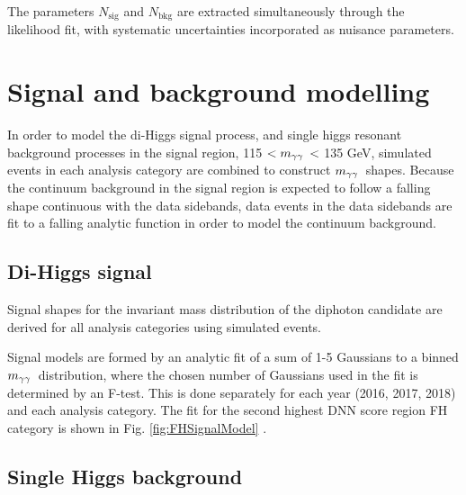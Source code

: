 The parameters \(N_{\text{sig}}\) and \(N_{\text{bkg}}\) are extracted simultaneously through the likelihood fit, with systematic uncertainties incorporated as nuisance parameters.


\section{Signal and background modelling} \label{sec:AnalyticFitting}

In order to model the di-Higgs signal process, and single higgs resonant background processes in the signal region, 115 $< m_{\gamma\gamma}\hspace{0.2em} < $ 135 GeV, simulated events
in each analysis category are combined to construct $m_{\gamma\gamma}\hspace{0.2em}$ shapes. Because the continuum background in the signal region is expected to follow a falling
shape continuous with the data sidebands, data events in the data sidebands are fit to a falling analytic function in order to model the continuum background.

\subsection{Di-Higgs signal}
\label{sec:SignalFitting}

Signal shapes for the invariant mass distribution of the diphoton candidate are derived for all analysis categories using simulated events.

Signal models are formed by an analytic fit of a sum of 1-5 Gaussians to a binned $m_{\gamma\gamma}\hspace{0.2em}$ distribution, where the chosen number of Gaussians used in the fit is
determined by an F-test. This is done separately for each year (2016, 2017, 2018) and each analysis category.
The fit for the second highest DNN score region FH category is shown
in Fig.  \ref{fig:FHSignalModel} .

\label{fig:FHSignalModel}


\subsection{Single Higgs background}

